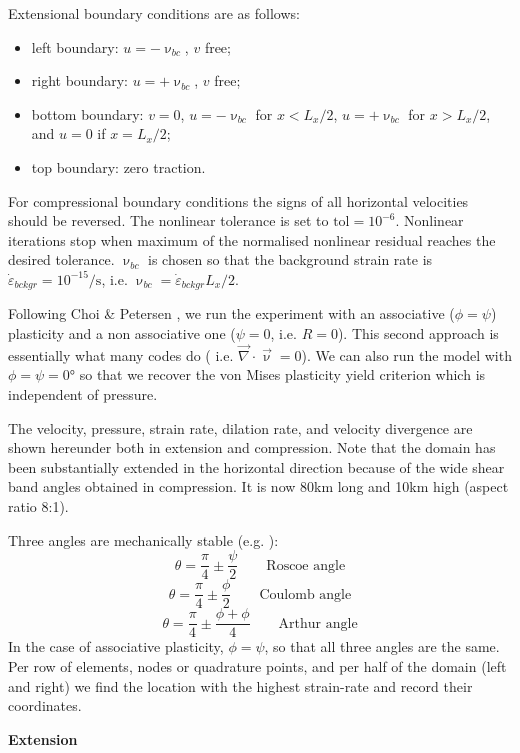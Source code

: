 Extensional boundary conditions are as follows: 
\begin{itemize}
\item left boundary: $u=- \upnu_{bc}$, $v$ free;
\item right boundary: $u=+ \upnu_{bc}$, $v$ free; 
\item bottom boundary: $v=0$, $u=- \upnu_{bc}$ for $x<L_x/2$,  $u=+ \upnu_{bc}$ for $x>L_x/2$, and $u=0$ if $x=L_x/2$;
\item top boundary: zero traction.
\end{itemize}
For compressional boundary conditions the signs of all horizontal velocities should be reversed.
The nonlinear tolerance is set to $\text{tol}=10^{-6}$. Nonlinear iterations stop when 
maximum of the normalised nonlinear residual reaches the desired tolerance.
$\upnu_{bc}$ is chosen so that the background strain rate is $\dot\varepsilon_{bckgr}=10^{-15}\si{\per\second}$, 
i.e. $\upnu_{bc}=\dot\varepsilon_{bckgr} L_x/2$.

Following Choi \& Petersen \cite{chpe15}, we run the experiment with an associative ($\phi=\psi$) plasticity
and a non associative one ($\psi=0$, i.e. $R=0$). This second approach is essentially what many codes do (
i.e. $\vec\nabla\cdot\vec\upnu = 0$). We can also run the model with $\phi=\psi=0\si{\degree}$ so that 
we recover the von Mises plasticity yield criterion which is independent of pressure.  

The velocity, pressure, strain rate, dilation rate, and velocity divergence are shown hereunder both in 
extension and compression. Note that the domain has been substantially extended in the horizontal 
direction because of the wide shear band angles obtained in compression. It is now 80\si{\km} long 
and 10\si{\km} high (aspect ratio 8:1). 

Three angles are mechanically stable (e.g. \cite{kaus10}):
\[
\theta=\frac{\pi}{4}\pm \frac{\psi}{2} \qquad \text{Roscoe angle}
\]
\[
\theta=\frac{\pi}{4}\pm \frac{\phi}{2} \qquad \text{Coulomb angle}
\]
\[
\theta=\frac{\pi}{4}\pm \frac{\phi+\phi}{4} \qquad \text{Arthur angle}
\]
In the case of associative plasticity, $\phi=\psi$, so that all three angles are the same. 
Per row of elements, nodes or quadrature points, and per half of the domain (left and right) we find the location
with the highest strain-rate and record their coordinates.


\newpage
{\bf Extension}

